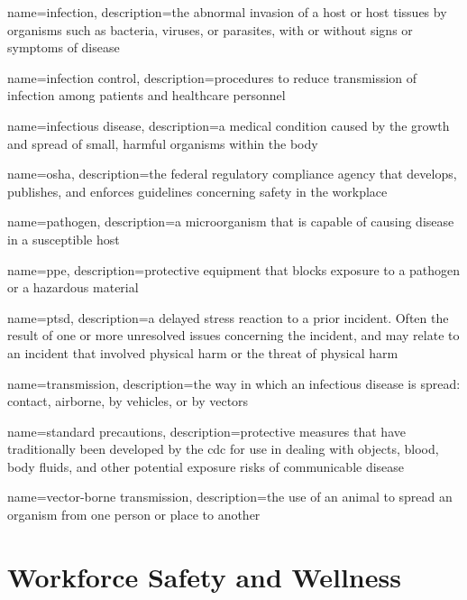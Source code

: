 \documentclass[../../EMT-169.tex]{subfiles}
\begin{document}
	{
		name=infection,
		description={the abnormal invasion of a host or host tissues by organisms such as bacteria, viruses, or parasites, with or without signs or symptoms of disease}
	}
	
	{
		name=infection control,
		description={procedures to reduce transmission of infection among patients and healthcare personnel}
	}
	
	{
		name=infectious disease,
		description={a medical condition caused by the growth and spread of small, harmful organisms within the body}
	}
	
	{
		name=\acrfull{osha},
		description={the federal regulatory compliance agency that develops, publishes, and enforces guidelines concerning safety in the workplace}
	}
	
	{
		name=pathogen,
		description={a microorganism that is capable of causing disease in a susceptible host}
	}
	
	{
		name=\acrfull{ppe},
		description={protective equipment that blocks exposure to a pathogen or a hazardous material}
	}
	
	{
		name=\acrfull{ptsd},
		description={a delayed stress reaction to a prior incident.  Often the result of one or more unresolved issues concerning the incident, and may relate to an incident that involved physical harm or the threat of physical harm}
	}
	
	{
		name=transmission,
		description={the way in which an infectious disease is spread: contact, airborne, by vehicles, or by vectors}
	}
	
	{
		name=standard precautions,
		description={protective measures that have traditionally been developed by the \acrshort{cdc} for use in dealing with objects, blood, body fluids, and other potential exposure risks of communicable disease}
	}
	
	{
		name=vector-borne transmission,
		description={the use of an animal to spread an organism from one person or place to another}
	}
	

\chapter{Workforce Safety and Wellness}
\end{document}
